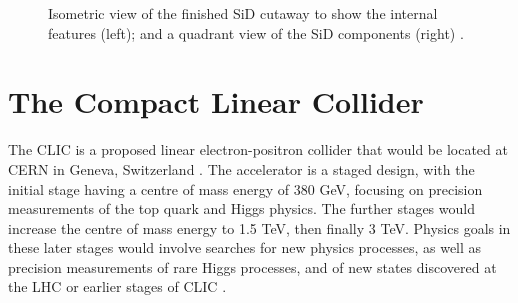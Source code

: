 \begin{figure}[p]%
	\centering
    \qquad
    \caption{Isometric view of the finished \acrshort{SiD} cutaway to show the internal features (left); and a quadrant view of the \acrshort{SiD} components (right) \cite{ilc-tdr-detectors}.}%
    \label{figure:colliders/SiD/double}%
\end{figure}

\section{The Compact Linear Collider}
The \acrfull{CLIC} is a proposed linear electron-positron collider that would be located at \acrshort{CERN} in Geneva, Switzerland \cite{clic-cdr-main}. The accelerator is a staged design, with the initial stage having a centre of mass energy of 380 GeV, focusing on precision measurements of the top quark and Higgs physics. The further stages would increase the centre of mass energy to 1.5 TeV, then finally 3 TeV. Physics goals in these later stages would involve searches for new physics processes, as well as precision measurements of rare Higgs processes, and of new states discovered at the LHC or earlier stages of \acrshort{CLIC} \cite{clic-cdr-physicsanddetector}. 

